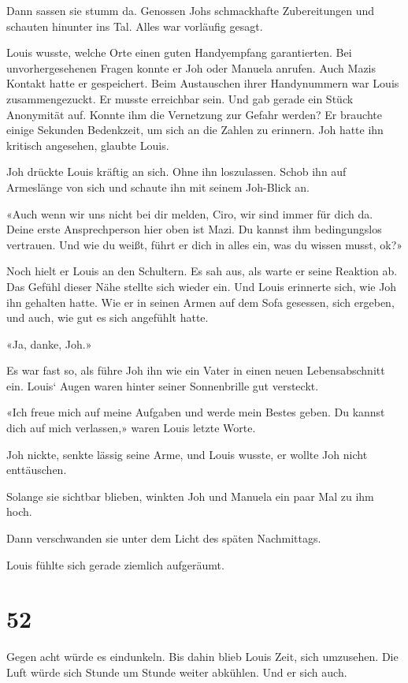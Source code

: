 Dann sassen sie stumm da. Genossen Johs schmackhafte Zubereitungen und
schauten hinunter ins Tal. Alles war vorläufig gesagt.

Louis wusste, welche Orte einen guten Handyempfang garantierten. Bei
unvorhergesehenen Fragen konnte er Joh oder Manuela anrufen. Auch Mazis
Kontakt hatte er gespeichert. Beim Austauschen ihrer Handynummern war
Louis zusammengezuckt. Er musste erreichbar sein. Und gab gerade ein
Stück Anonymität auf. Konnte ihm die Vernetzung zur Gefahr werden? Er
brauchte einige Sekunden Bedenkzeit, um sich an die Zahlen zu erinnern.
Joh hatte ihn kritisch angesehen, glaubte Louis.

Joh drückte Louis kräftig an sich. Ohne ihn loszulassen. Schob ihn auf
Armeslänge von sich und schaute ihn mit seinem Joh-Blick an.

«Auch wenn wir uns nicht bei dir melden, Ciro, wir sind immer für dich
da. Deine erste Ansprechperson hier oben ist Mazi. Du kannst ihm
bedingungslos vertrauen. Und wie du weißt, führt er dich in alles ein,
was du wissen musst, ok?»

Noch hielt er Louis an den Schultern. Es sah aus, als warte er seine
Reaktion ab. Das Gefühl dieser Nähe stellte sich wieder ein. Und Louis
erinnerte sich, wie Joh ihn gehalten hatte. Wie er in seinen Armen auf
dem Sofa gesessen, sich ergeben, und auch, wie gut es sich angefühlt
hatte.

«Ja, danke, Joh.»

Es war fast so, als führe Joh ihn wie ein Vater in einen neuen
Lebensabschnitt ein. Louis` Augen waren hinter seiner Sonnenbrille gut
versteckt.

«Ich freue mich auf meine Aufgaben und werde mein Bestes geben. Du
kannst dich auf mich verlassen,» waren Louis letzte Worte.

Joh nickte, senkte lässig seine Arme, und Louis wusste, er wollte Joh
nicht enttäuschen.

Solange sie sichtbar blieben, winkten Joh und Manuela ein paar Mal zu
ihm hoch.

Dann verschwanden sie unter dem Licht des späten Nachmittags.

Louis fühlte sich gerade ziemlich aufgeräumt.

\chapter{52}\label{section-52}

Gegen acht würde es eindunkeln. Bis dahin blieb Louis Zeit, sich
umzusehen. Die Luft würde sich Stunde um Stunde weiter abkühlen. Und er
sich auch.

